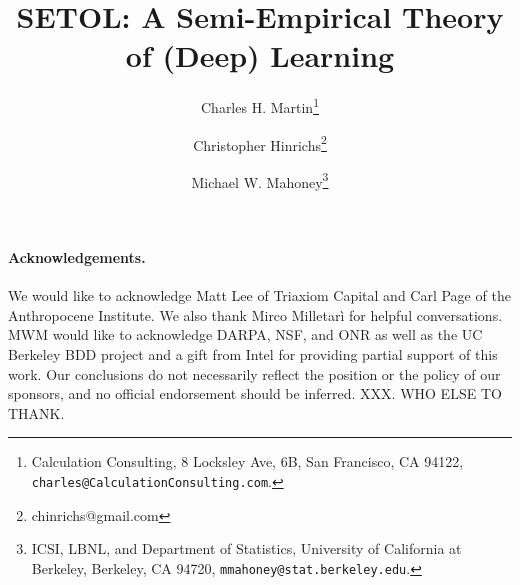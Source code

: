 \documentclass[11pt]{article}
\begin{document}
\title{%
SETOL: A Semi-Empirical Theory of (Deep) Learning
}

\author{%
Charles H. Martin\thanks{Calculation Consulting, 8 Locksley Ave, 6B, San Francisco, CA 94122, \texttt{charles@CalculationConsulting.com}.} 
\and
Christopher Hinrichs\thanks{chinrichs@gmail.com}
\and
Michael W. Mahoney\thanks{ICSI, LBNL, and Department of Statistics, University of California at Berkeley, Berkeley, CA 94720, \texttt{mmahoney@stat.berkeley.edu}.}
}

\date{}
\maketitle

\begin{abstract}

\end{abstract}

\newpage
\tableofcontents


\newpage

\newpage

\newpage

\newpage

\newpage

\newpage

\newpage



\noindent
\paragraph{Acknowledgements.}
We would like to acknowledge Matt Lee of Triaxiom Capital and Carl Page of the Anthropocene Institute.
We also thank Mirco Milletarì for helpful conversations.
MWM would like to acknowledge DARPA, NSF, and ONR as well as the UC Berkeley BDD project and a gift from Intel for providing partial support of this work.
Our conclusions do not necessarily reflect the position or the policy of our sponsors, and no official endorsement should be inferred.
XXX.  WHO ELSE TO THANK.



%
{\small
%

%
}


\appendix


\end{document}
